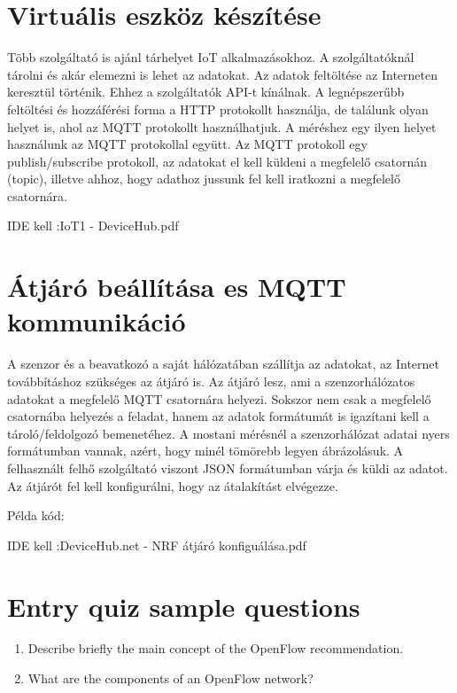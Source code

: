 \documentclass[a4paper]{article}
\begin{document}
\section{ Virtuális eszköz készítése}

Több szolgáltató is ajánl tárhelyet IoT alkalmazásokhoz. A szolgáltatóknál tárolni és akár elemezni is lehet az adatokat. Az adatok feltöltése az Interneten keresztül történik. Ehhez a szolgáltatók API-t kínálnak. A legnépszerűbb feltöltési és hozzáférési forma a HTTP protokollt használja, de találunk olyan helyet is, ahol az MQTT protokollt használhatjuk. A méréshez egy ilyen helyet használunk az MQTT protokollal együtt. Az MQTT protokoll egy publish/subscribe protokoll, az adatokat el kell küldeni a megfelelő csatornán (topic), illetve ahhoz, hogy adathoz jussunk fel kell iratkozni a megfelelő csatornára.

IDE kell :IoT1 - DeviceHub.pdf

\section{Átjáró beállítása es MQTT kommunikáció}
 
A szenzor és a beavatkozó a saját hálózatában szállítja az adatokat, az Internet továbbításhoz szükséges az átjáró is. Az átjáró lesz, ami a szenzorhálózatos adatokat a megfelelő MQTT csatornára helyezi. Sokszor nem csak a megfelelő csatornába helyezés a feladat, hanem az adatok formátumát is igazítani kell a tároló/feldolgozó bemenetéhez. A mostani mérésnél a szenzorhálózat adatai nyers formátumban vannak, azért, hogy minél tömörebb legyen ábrázolásuk. A felhasznált felhő szolgáltató viszont JSON formátumban várja és küldi az adatot. Az átjárót fel kell konfigurálni, hogy az átalakítást elvégezze.

Példa kód:


IDE kell :DeviceHub.net - NRF átjáró konfiguálása.pdf

\appendix

\section{Entry quiz sample questions}

\begin{enumerate}
    \item Describe briefly the main concept of the OpenFlow recommendation.
    \item What are the components of an OpenFlow network?
\end{enumerate}
\end{document}
